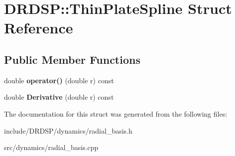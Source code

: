 \hypertarget{struct_d_r_d_s_p_1_1_thin_plate_spline}{\section{D\-R\-D\-S\-P\-:\-:Thin\-Plate\-Spline Struct Reference}
\label{struct_d_r_d_s_p_1_1_thin_plate_spline}
}
\subsection*{Public Member Functions}
\begin{DoxyCompactItemize}
\item 
\hypertarget{struct_d_r_d_s_p_1_1_thin_plate_spline_a0282d868aa5e4f4cb077ed61dd343a0a}{double {\bfseries operator()} (double r) const }\label{struct_d_r_d_s_p_1_1_thin_plate_spline_a0282d868aa5e4f4cb077ed61dd343a0a}

\item 
\hypertarget{struct_d_r_d_s_p_1_1_thin_plate_spline_a42377bcfa0b624e7dc2569a411d06b19}{double {\bfseries Derivative} (double r) const }\label{struct_d_r_d_s_p_1_1_thin_plate_spline_a42377bcfa0b624e7dc2569a411d06b19}

\end{DoxyCompactItemize}


The documentation for this struct was generated from the following files\-:\begin{DoxyCompactItemize}
\item 
include/\-D\-R\-D\-S\-P/dynamics/radial\-\_\-basis.\-h\item 
src/dynamics/radial\-\_\-basis.\-cpp\end{DoxyCompactItemize}
